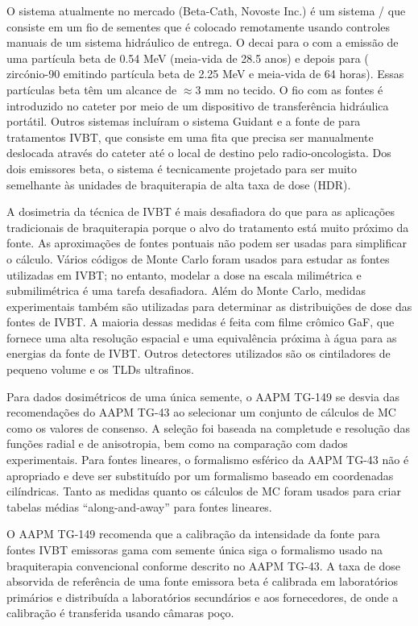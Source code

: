 \documentclass[11pt,a4paper]{article}
\begin{document}
    O sistema atualmente no mercado (Beta-Cath, Novoste Inc.) é um sistema / que consiste em um fio de sementes que é colocado remotamente usando controles manuais de um sistema hidráulico de entrega. O  decai para o  com a emissão de uma partícula beta de 0.54 MeV (meia-vida de 28.5 anos) e depois para  ( zircónio-90 emitindo partícula beta de 2.25 MeV e meia-vida de 64 horas). Essas partículas beta têm um alcance de $\approx$3 mm no tecido. O fio com as fontes é introduzido no cateter por meio de um dispositivo de transferência hidráulica portátil. Outros sistemas incluíram o sistema Guidant e a fonte de  para tratamentos IVBT, que consiste em uma fita que precisa ser manualmente deslocada através do cateter até o local de destino pelo radio-oncologista. Dos dois emissores beta, o sistema  é tecnicamente projetado para ser muito semelhante às unidades de braquiterapia de alta taxa de dose (HDR).

    A dosimetria da técnica de IVBT é mais desafiadora do que para as aplicações tradicionais de braquiterapia porque o alvo do tratamento está muito próximo da fonte. As aproximações de fontes pontuais não podem ser usadas para simplificar o cálculo. Vários códigos de Monte Carlo foram usados para estudar as fontes utilizadas em IVBT; no entanto, modelar a dose na escala milimétrica e submilimétrica é uma tarefa desafiadora. Além do Monte Carlo, medidas experimentais também são utilizadas para determinar as distribuições de dose das fontes de IVBT. A maioria dessas medidas é feita com filme crômico GaF, que fornece uma alta resolução espacial e uma equivalência próxima à água para as energias da fonte de IVBT. Outros detectores utilizados são os cintiladores de pequeno volume e os TLDs ultrafinos.

    Para dados dosimétricos de uma única semente, o AAPM TG-149 se desvia das recomendações do AAPM TG-43 ao selecionar um conjunto de cálculos de MC como os valores de consenso. A seleção foi baseada na completude e resolução das funções radial e de anisotropia, bem como na comparação com dados experimentais. Para fontes lineares, o formalismo esférico da AAPM TG-43 não é apropriado e deve ser substituído por um formalismo baseado em coordenadas cilíndricas. Tanto as medidas quanto os cálculos de MC foram usados para criar tabelas médias ``along-and-away'' para fontes lineares.

    O AAPM TG-149 recomenda que a calibração da intensidade da fonte para fontes IVBT emissoras gama com semente única siga o formalismo usado na braquiterapia convencional conforme descrito no AAPM TG-43. A taxa de dose absorvida de referência de uma fonte emissora beta é calibrada em laboratórios primários e distribuída a laboratórios secundários e aos fornecedores, de onde a calibração é transferida usando câmaras poço.


\end{document}
